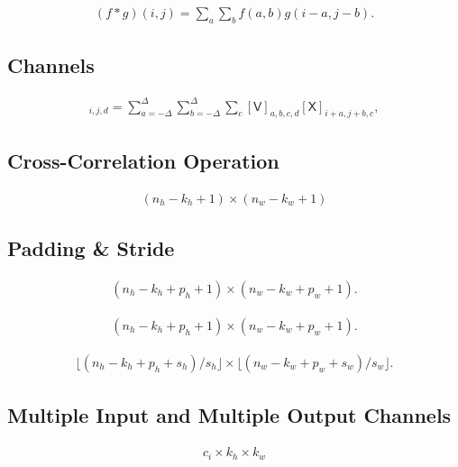 \documentclass[a4paper,12pt]{article}
\theoremstyle{definition}
\begin{document}
\begin{align*}
    (f * g)(i, j) = \sum_a\sum_b f(a, b) g(i-a, j-b).
\end{align*}


\subsection*{Channels}

\begin{align*}
    [\mathsf{H}]_{i,j,d} = \sum_{a = -\Delta}^{\Delta} \sum_{b = -\Delta}^{\Delta} \sum_c [\mathsf{V}]_{a, b, c, d} [\mathsf{X}]_{i+a, j+b, c},
\end{align*}


\subsection*{Cross-Correlation Operation}

\begin{align*}
    (n_h-k_h+1) \times (n_w-k_w+1)
\end{align*}


\subsection{Padding \& Stride}

\begin{align*}
    (n_h-k_h+p_h+1)\times(n_w-k_w+p_w+1).
\end{align*}



\begin{align*}
    (n_h-k_h+p_h+1)\times(n_w-k_w+p_w+1).
\end{align*}



\begin{align*}
    \lfloor(n_h-k_h+p_h+s_h)/s_h\rfloor \times \lfloor(n_w-k_w+p_w+s_w)/s_w\rfloor.
\end{align*}


\subsection{Multiple Input and Multiple Output Channels}


\begin{align*}
    c_i\times k_h\times k_w
\end{align*}
\end{document}
